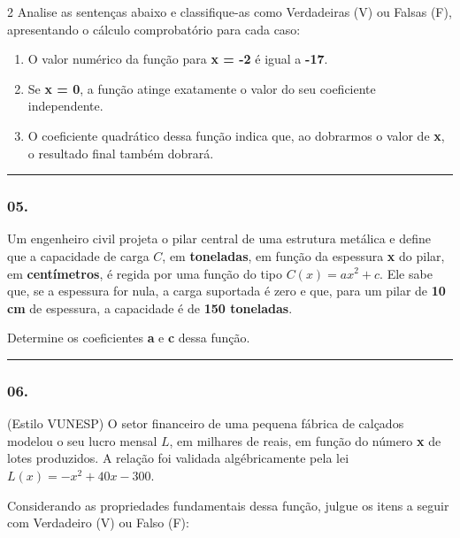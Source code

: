 \documentclass[twoside, 10pt, a4paper]{article}
\newlength{\espacoPreQuestao}
\newlength{\espacoQuestao}
\begin{document}
\begin{multicols*}{2}
Analise as sentenças abaixo e classifique-as como Verdadeiras (V) ou Falsas (F), apresentando o cálculo comprobatório para cada caso:

\begin{enumerate}[label=\Roman*.]
    \item O valor numérico da função para \textbf{x = -2} é igual a \textbf{-17}.
    \item Se \textbf{x = 0}, a função atinge exatamente o valor do seu coeficiente independente.
    \item O coeficiente quadrático dessa função indica que, ao dobrarmos o valor de \textbf{x}, o resultado final também dobrará.
\end{enumerate}
\par\vspace{\espacoQuestao}

\noindent\textcolor{CorLinha}{\rule{\linewidth}{0.5pt}} 
\par\vspace{\espacoPreQuestao}
\subsubsection*{05.} Um engenheiro civil projeta o pilar central de uma estrutura metálica e define que a capacidade de carga $C$, em \textbf{toneladas}, em função da espessura \textbf{x} do pilar, em \textbf{centímetros}, é regida por uma função do tipo $C(x) = ax^2 + c$. Ele sabe que, se a espessura for nula, a carga suportada é zero e que, para um pilar de \textbf{10 cm} de espessura, a capacidade é de \textbf{150 toneladas}.

Determine os coeficientes \textbf{a} e \textbf{c} dessa função.
\par\vspace{\espacoQuestao}

\noindent\textcolor{CorLinha}{\rule{\linewidth}{0.5pt}} 
\par\vspace{\espacoPreQuestao}
\subsubsection*{06.} (Estilo VUNESP) O setor financeiro de uma pequena fábrica de calçados modelou o seu lucro mensal $L$, em milhares de reais, em função do número \textbf{x} de lotes produzidos. A relação foi validada algébricamente pela lei $L(x) = -x^2 + 40x - 300$.

Considerando as propriedades fundamentais dessa função, julgue os itens a seguir com Verdadeiro (V) ou Falso (F):


\end{multicols*}
\end{document}
